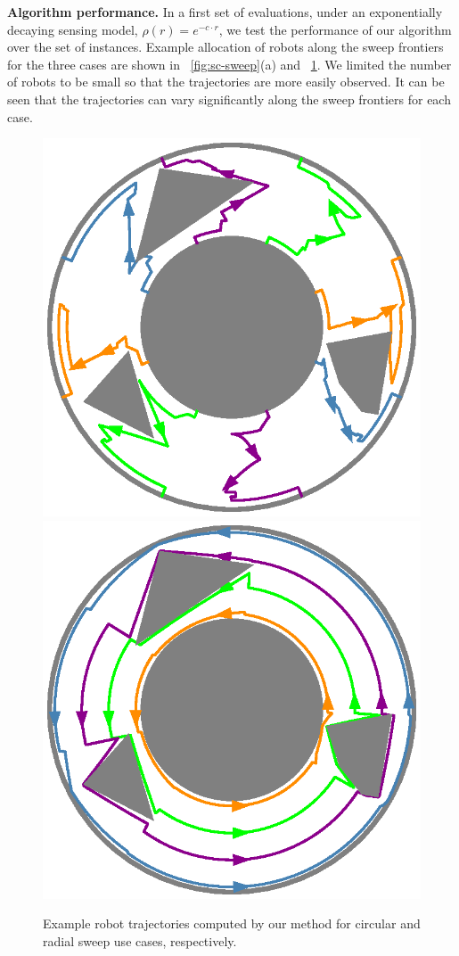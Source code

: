 \textbf{Algorithm performance.} In a first set of evaluations, under an exponentially 
decaying sensing 
model, $\rho(r) = e^{-c\cdot r}$, we test the performance of our algorithm over 
the set of instances. Example allocation of robots along the sweep frontiers for 
the three cases are shown in ~\ref{fig:sc-sweep}(a) and ~\ref{fig:sc-simulations}. 
We limited the number of robots to be small so that the trajectories are more easily 
observed. It can be seen that the trajectories can vary significantly along the 
sweep frontiers for each case. 
\begin{figure}[ht]
    \centering
    \includegraphics[width=.45\linewidth]{chapters/sc/fig/circular_sol.eps}\hspace{2mm}
    \includegraphics[width=.45\linewidth]{chapters/sc/fig/rotational_sol.eps}
    
    \caption[Example robot trajectories]{Example robot trajectories computed by our method for circular and radial 
    sweep use cases, respectively.
    }
    \label{fig:sc-simulations}
\end{figure}


